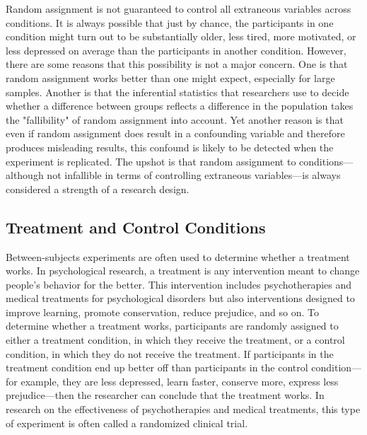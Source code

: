        

Random assignment is not guaranteed to control all extraneous variables across conditions. It is always possible that
just by chance, the participants in one condition might turn out to be substantially older, less tired, more motivated, or less depressed on average than the participants in another condition. However, there are some reasons that this possibility is not a major concern. One is that random assignment works better than one might expect, especially for large samples. Another is that the inferential statistics that researchers use to decide whether a difference between groups reflects a difference in the population takes the "fallibility" of random assignment into account. Yet another reason is that even if random assignment does result in a confounding variable and therefore produces misleading results, this confound is likely to be detected when the experiment is replicated. The upshot is that random assignment to conditions---although not infallible in terms of controlling extraneous variables---is always considered a strength of a research design.

\subsection{Treatment and Control Conditions}

Between-subjects experiments are often used to determine whether a treatment works. In psychological research, a treatment is any intervention meant to change people's behavior for the better. This intervention includes psychotherapies and medical treatments for psychological disorders but also interventions designed to improve learning, promote conservation, reduce prejudice, and so on. To determine whether a treatment works, participants are randomly assigned to either a treatment condition, in which they receive the treatment, or a control condition, in which they do not receive the treatment. If participants in the treatment condition end up better off than participants in the control condition---for example, they are less depressed, learn faster, conserve more, express less prejudice---then the researcher can conclude that the treatment works. In research on the effectiveness of psychotherapies and medical treatments, this type of experiment is often called a randomized clinical trial.

